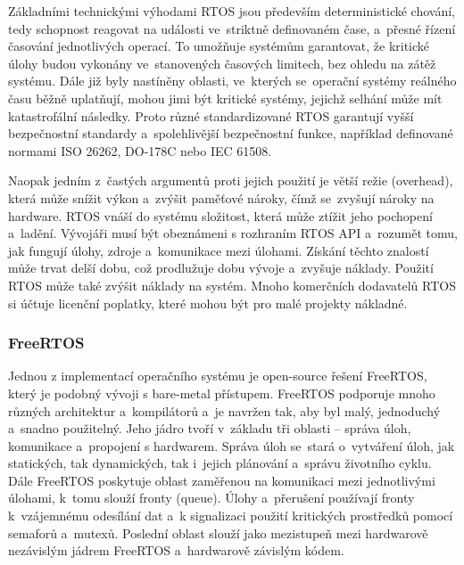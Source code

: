 Základními technickými výhodami RTOS jsou především deterministické chování, tedy schopnost reagovat na události ve~striktně definovaném čase, a~přesné řízení časování jednotlivých operací. To umožňuje systémům garantovat, že kritické úlohy budou vykonány ve~stanovených časových limitech, bez ohledu na zátěž systému. Dále již byly nastíněny oblasti, ve~kterých se~operační systémy reálného času běžně uplatňují, mohou jimi být kritické systémy, jejichž selhání může mít katastrofální následky. Proto různé standardizované RTOS garantují vyšší bezpečnostní standardy a~spolehlivější bezpečnostní funkce, například definované normami ISO 26262, DO-178C nebo IEC 61508.~\cite{freertos_safertos}

Naopak jedním z~častých argumentů proti jejich použití je větší režie (overhead), která může snížit výkon a~zvýšit paměťové nároky, čímž se~zvyšují nároky na hardware. RTOS vnáší do systému složitost, která může ztížit jeho pochopení a~ladění. Vývojáři musí být obeznámeni s rozhraním RTOS API a~rozumět tomu, jak fungují úlohy, zdroje a~komunikace mezi úlohami. Získání těchto znalostí může trvat delší dobu, což prodlužuje dobu vývoje a~zvyšuje náklady. Použití RTOS může také zvýšit náklady na systém. Mnoho komerčních dodavatelů RTOS si účtuje licenční poplatky, které mohou být pro malé projekty nákladné.~\cite{sysgo_baremetal_vs_rtos}

\subsubsection{FreeRTOS}
Jednou z implementací operačního systému je open-source řešení FreeRTOS, který je podobný vývoji s bare-metal přístupem. FreeRTOS podporuje mnoho různých architektur a~kompilátorů a~je navržen tak, aby byl malý, jednoduchý a~snadno použitelný. Jeho jádro tvoří v~základu tři oblasti -- správa úloh, komunikace a~propojení s hardwarem. Správa úloh se~stará o~vytváření úloh, jak statických, tak dynamických, tak i~jejich plánování a~správu životního cyklu. Dále FreeRTOS poskytuje oblast zaměřenou na komunikaci mezi jednotlivými úlohami, k~tomu slouží fronty (queue). Úlohy a~přerušení používají fronty k~vzájemnému odesílání dat a~k signalizaci použití kritických prostředků pomocí semaforů a~mutexů. Poslední oblast slouží jako mezistupeň mezi hardwarově nezávislým jádrem FreeRTOS a~hardwarově závislým kódem.~\cite{the_architecture_of_open_source_applications}

